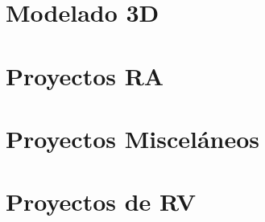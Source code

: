 \documentclass[aspectratio=169,compress]{beamer}
\begin{document}





\section{Modelado 3D}















\section{Proyectos RA}







\section{Proyectos Misceláneos}








\section{Proyectos de RV}




\end{document}
